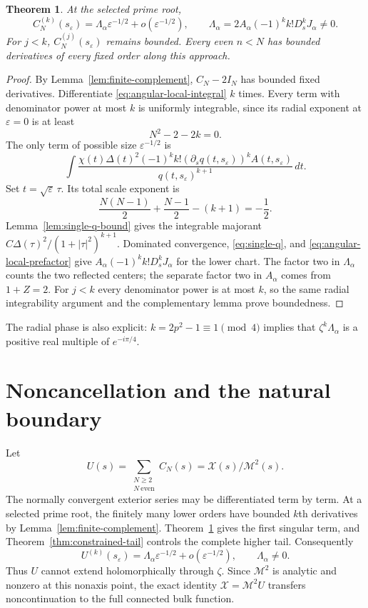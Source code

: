 \documentclass[11pt]{article}
\numberwithin{equation}{section}
\newtheorem{theorem}{Theorem}[section]
\theoremstyle{remark}\newtheorem{remark}[theorem]{Remark}
\newcommand{\X}{\mathcal X}
\newcommand{\Mtwo}{\mathcal M^2}
\begin{document}
\begin{theorem}\label{thm:single-first}
At the selected prime root,
\[
 C_N^{(k)}(s_\varepsilon)
   =\Lambda_\alpha\varepsilon^{-1/2}
          +o(\varepsilon^{-1/2}),
 \qquad
 \Lambda_\alpha=2A_\alpha(-1)^kk!D_s^kJ_\alpha\ne0.
\]
For $j<k$, $C_N^{(j)}(s_\varepsilon)$ remains bounded.
Every even $n<N$ has bounded derivatives of every fixed order
along this approach.
\end{theorem}
\begin{proof}
By Lemma~\ref{lem:finite-complement}, $C_N-2I_N$ has bounded
fixed derivatives.  Differentiate \eqref{eq:angular-local-integral}
$k$ times.  Every term with denominator power at most $k$ is
uniformly integrable, since its radial exponent at
$\varepsilon=0$ is at least
\[
 N^2-2-2k=0.
\]
The only term of possible size $\varepsilon^{-1/2}$ is
\[
 \int \frac{\chi(t)\Delta(t)^2
    (-1)^kk!(\partial_s q(t,s_\varepsilon))^k A(t,s_\varepsilon)}
       {q(t,s_\varepsilon)^{k+1}}\,dt.
\]
Set $t=\sqrt\varepsilon\,\tau$.  Its total scale exponent is
\[
 \frac{N(N-1)}2+\frac{N-1}{2}-(k+1)=-\frac12.
\]
Lemma~\ref{lem:single-q-bound} gives the integrable majorant
$C\Delta(\tau)^2/(1+|\tau|^2)^{k+1}$.
Dominated convergence, \eqref{eq:single-q}, and
\eqref{eq:angular-local-prefactor} give
$A_\alpha(-1)^kk!D_s^kJ_\alpha$ for the lower chart.
The factor two in $\Lambda_\alpha$ counts the two reflected
centers; the separate factor two in $A_\alpha$ comes from $1+Z=2$.
For $j<k$ every denominator power is at most $k$, so the same
radial integrability argument and the complementary lemma prove
boundedness.
\end{proof}

The radial phase is also explicit: $k=2p^2-1\equiv1\pmod4$ implies that
$\zeta^k\Lambda_\alpha$ is a positive real multiple of
$e^{-i\pi/4}$.
\section{Noncancellation and the natural boundary}

Let
\[
 U(s)=\sum_{\substack{N\ge2\\N\ \mathrm{even}}}C_N(s)
             =\X(s)/\Mtwo(s).
\]
The normally convergent exterior series may be differentiated term
by term. At a selected prime root, the finitely many lower orders
have bounded $k$th derivatives by Lemma~\ref{lem:finite-complement}.
Theorem~\ref{thm:single-first} gives the first singular term, and
Theorem~\ref{thm:constrained-tail} controls the complete higher tail.
Consequently
\begin{equation}\label{eq:U-leading}
 U^{(k)}(s_\varepsilon)
       =\Lambda_\alpha\varepsilon^{-1/2}
                           +o(\varepsilon^{-1/2}),
 \qquad \Lambda_\alpha\ne0.
\end{equation}
Thus $U$ cannot extend holomorphically through $\zeta$.
Since $\Mtwo$ is analytic and nonzero at this nonaxis point,
the exact identity $\X=\Mtwo U$ transfers noncontinuation to
the full connected bulk function.
\end{document}
